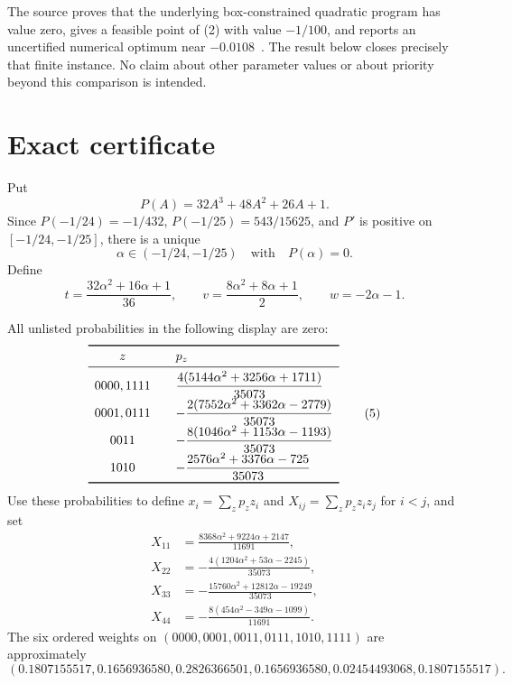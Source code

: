 \documentclass[11pt]{article}
\begin{document}
The source proves that the underlying box-constrained quadratic program has
value zero, gives a feasible point of (2) with value $-1/100$, and reports an
uncertified numerical optimum near $-0.0108$~\cite[Propositions 1--3 and
Appendix A]{ZhangWang2026}.  The result below closes precisely that finite
instance.  No claim about other parameter values or about priority beyond this
comparison is intended.

\section{Exact certificate}

Put
\[
P(A)=32A^3+48A^2+26A+1.
\]
Since $P(-1/24)=-1/432$, $P(-1/25)=543/15625$, and $P'$ is positive on
$[-1/24,-1/25]$, there is a unique
\begin{equation}
\alpha\in(-1/24,-1/25)\quad\text{with}\quad P(\alpha)=0.          \tag{3}
\end{equation}
Define
\begin{equation}
t=\frac{32\alpha^2+16\alpha+1}{36},\qquad
v=\frac{8\alpha^2+8\alpha+1}{2},\qquad w=-2\alpha-1.             \tag{4}
\end{equation}

All unlisted probabilities in the following display are zero:
\begin{equation}
\begin{array}{c@{\qquad}l}
\toprule
z & p_z\\
\midrule
0000,1111 & \displaystyle \frac{4(5144\alpha^2+3256\alpha+1711)}{35073}\\[3pt]
0001,0111 & \displaystyle -\frac{2(7552\alpha^2+3362\alpha-2779)}{35073}\\[3pt]
0011 & \displaystyle -\frac{8(1046\alpha^2+1153\alpha-1193)}{35073}\\[3pt]
1010 & \displaystyle -\frac{2576\alpha^2+3376\alpha-725}{35073}\\
\bottomrule
\end{array}                                                       \tag{5}
\end{equation}
Use these probabilities to define $x_i=\sum_z p_z z_i$ and
$X_{ij}=\sum_z p_z z_i z_j$ for $i<j$, and set
\begin{align}
X_{11}&=\frac{8368\alpha^2+9224\alpha+2147}{11691},\nonumber\\
X_{22}&=-\frac{4(1204\alpha^2+53\alpha-2245)}{35073},\nonumber\\
X_{33}&=-\frac{15760\alpha^2+12812\alpha-19249}{35073},\nonumber\\
X_{44}&=-\frac{8(454\alpha^2-349\alpha-1099)}{11691}.            \tag{6}
\end{align}
The six ordered weights on
$(0000,0001,0011,0111,1010,1111)$ are approximately
\[
(0.1807155517,0.1656936580,0.2826366501,
  0.1656936580,0.02454493068,0.1807155517).
\]
\end{document}
